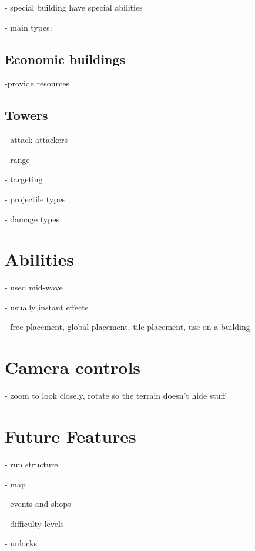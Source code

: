 - special building have special abilities

- main types:

\subsection{Economic buildings}

-provide resources

\subsection{Towers}

- attack attackers

- range

- targeting

- projectile types

- damage types

\section{Abilities}

- used mid-wave

- usually instant effects

- free placement, global placement, tile placement, use on a building

\section{Camera controls}

- zoom to look closely, rotate so the terrain doesn't hide stuff

\section{Future Features}

- run structure

- map

- events and shops

- difficulty levels

- unlocks

